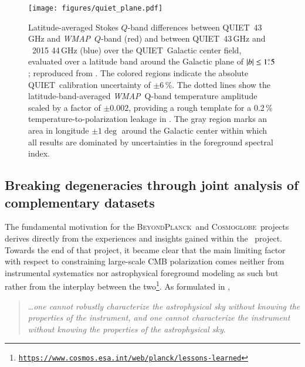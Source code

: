 \documentclass[twocolumn]{aa}
\def\WMAP{\textit{WMAP}}
\newcommand{\BP}{\textsc{BeyondPlanck}}
\newcommand{\cosmoglobe}{\textsc{Cosmoglobe}}
\begin{document}
\begin{figure}[t]
    \center
    \texttt{[image: figures/quiet\_plane.pdf]}
    \caption{Latitude-averaged Stokes $Q$-band differences between
      QUIET\ 43\,GHz and \WMAP\ $Q$-band (red) and between
      QUIET\ 43\,GHz and \Planck\ 2015 44\,GHz (blue) over the
      QUIET\ Galactic center field, evaluated over a latitude band
      around the Galactic plane of $|b| \leq 1\pdeg5$; reproduced from
      \citet{ruud:2015}. The colored regions indicate the absolute
      QUIET\ calibration uncertainty of $\pm$6$\,$\%. The dotted
      lines show the latitude-band-averaged \WMAP\ Q-band temperature
      amplitude scaled by a factor of $\pm 0.002$, providing a rough
      template for a 0.2\,\% temperature-to-polarization leakage in \Planck. The
      gray region marks an area in longitude $\pm 1\deg$ around the
      Galactic center within which all results are dominated by
      uncertainties in the foreground spectral index.}
    \label{fig:quiet}
\end{figure}

\subsection{Breaking degeneracies through joint analysis of complementary datasets}

The fundamental motivation for the \BP\ and \cosmoglobe\ projects derives directly from the experiences and insights gained within the \Planck\ project. Towards the end of that project, it became clear that the main limiting factor with respect to constraining large-scale CMB polarization comes neither from instrumental systematics nor astrophysical foreground modeling as such but rather from the interplay between the two\footnote{ \href{https://www.cosmos.esa.int/web/planck/lessons-learned} {\texttt{https://www.cosmos.esa.int/web/planck/lessons-learned}}}. As formulated in \citet{bp01},
\begin{quotation}
\ldots \emph{one cannot robustly characterize the astrophysical sky without
  knowing the properties of the instrument, and one cannot
  characterize the instrument without knowing the properties of the
  astrophysical sky}.
\end{quotation}
\end{document}
